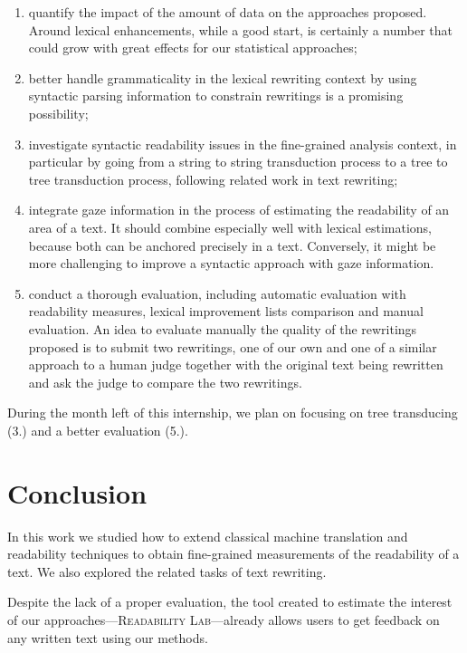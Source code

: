 \documentclass[a4paper, 11pt, onepage]{scrreprt}
\begin{document}
\begin{enumerate}
\item quantify the impact of the amount of data on the approaches
  proposed. Around  lexical enhancements, while a good
  start, is certainly a number that could grow with great effects for
  our statistical approaches;
\item better handle grammaticality in the lexical rewriting context by
  using syntactic parsing information to constrain rewritings is a
  promising possibility;
\item investigate syntactic readability issues in the fine-grained
  analysis context, in particular by going from a string to string
  transduction process to a tree to tree transduction process,
  following related work in text rewriting;
\item integrate gaze information in the process of estimating the
  readability of an area of a text. It should combine especially well
  with lexical estimations, because both can be anchored precisely in
  a text. Conversely, it might be more challenging to improve a
  syntactic approach with gaze information.
\item conduct a thorough evaluation, including automatic evaluation
  with readability measures, lexical improvement lists comparison and
  manual evaluation. An idea to evaluate manually the quality of the
  rewritings proposed is to submit two rewritings, one of our own and
  one of a similar approach to a human judge together with the
  original text being rewritten and ask the judge to compare the two
  rewritings.
\end{enumerate}

During the month left of this internship, we plan on focusing on tree
transducing (3.) and a better evaluation (5.).

\chapter{Conclusion}

In this work we studied how to extend classical machine translation
and readability techniques to obtain fine-grained measurements of the
readability of a text. We also explored the related tasks of text
rewriting.

Despite the lack of a proper evaluation, the tool created to estimate
the interest of our approaches—\textsc{Readability Lab}—already allows
users to get feedback on any written text using our methods.
\end{document}
